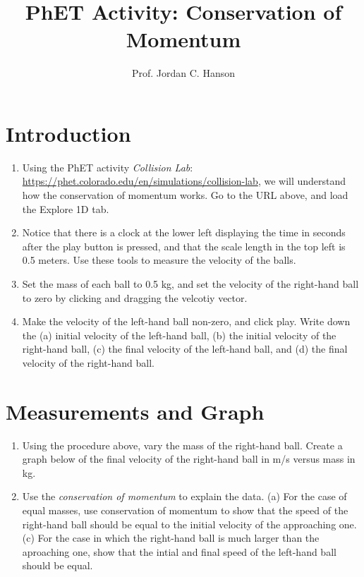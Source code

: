 \documentclass{article}
\begin{document}
\title{PhET Activity: Conservation of Momentum}
\author{Prof. Jordan C. Hanson}

\maketitle

\section{Introduction}

\begin{enumerate}
\item Using the PhET activity \textit{Collision Lab}: \url{https://phet.colorado.edu/en/simulations/collision-lab}, we will understand how the conservation of momentum works.  Go to the URL above, and load the Explore 1D tab.
\item Notice that there is a clock at the lower left displaying the time in seconds after the play button is pressed, and that the scale length in the top left is 0.5 meters.  Use these tools to measure the velocity of the balls.
\item Set the mass of each ball to 0.5 kg, and set the velocity of the right-hand ball to zero by clicking and dragging the velcotiy vector.
\item Make the velocity of the left-hand ball non-zero, and click play.  Write down the (a) initial velocity of the left-hand ball, (b) the initial velocity of the right-hand ball, (c) the final velocity of the left-hand ball, and (d) the final velocity of the right-hand ball. \\ \vspace{2cm}
\end{enumerate}

\section{Measurements and Graph}

\begin{enumerate}
\item Using the procedure above, vary the mass of the right-hand ball.  Create a graph below of the final velocity of the right-hand ball in m/s versus mass in kg. \\ \vspace{4cm}
\item Use the \textit{conservation of momentum} to explain the data.  (a) For the case of equal masses, use conservation of momentum to show that the speed of the right-hand ball should be equal to the initial velocity of the approaching one.  (c) For the case in which the right-hand ball is much larger than the aproaching one, show that the intial and final speed of the left-hand ball should be equal.
\end{enumerate}
\end{document}
